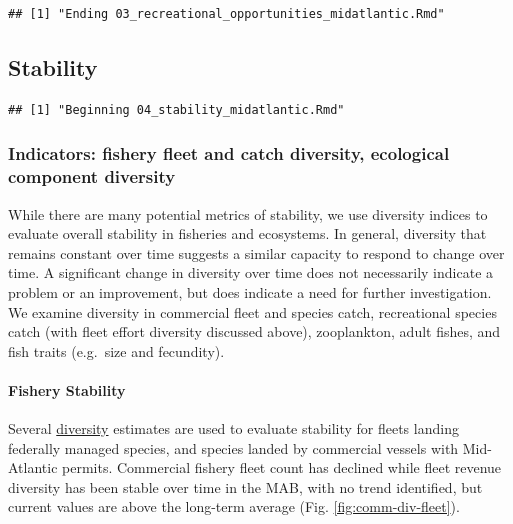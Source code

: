 \documentclass[
  10pt,
]{article}
\begin{document}
\begin{verbatim}
## [1] "Ending 03_recreational_opportunities_midatlantic.Rmd"
\end{verbatim}

\subsection{Stability}\label{stability}

\begin{verbatim}
## [1] "Beginning 04_stability_midatlantic.Rmd"
\end{verbatim}

\subsubsection{Indicators: fishery fleet and catch diversity, ecological component diversity}\label{indicators-fishery-fleet-and-catch-diversity-ecological-component-diversity}

While there are many potential metrics of stability, we use diversity indices to evaluate overall stability in fisheries and ecosystems. In general, diversity that remains constant over time suggests a similar capacity to respond to change over time. A significant change in diversity over time does not necessarily indicate a problem or an improvement, but does indicate a need for further investigation. We examine diversity in commercial fleet and species catch, recreational species catch (with fleet effort diversity discussed above), zooplankton, adult fishes, and fish traits (e.g.~size and fecundity).

\paragraph{Fishery Stability}\label{fishery-stability}

Several \href{https://noaa-edab.github.io/catalog/commercial_div.html}{diversity} estimates are used to evaluate stability for fleets landing federally managed species, and species landed by commercial vessels with Mid-Atlantic permits. Commercial fishery fleet count has declined while fleet revenue diversity has been stable over time in the MAB, with no trend identified, but current values are above the long-term average (Fig. \ref{fig:comm-div-fleet}).
\end{document}
